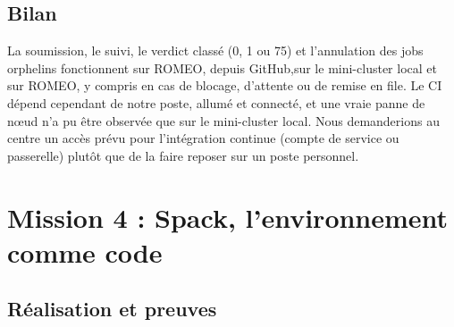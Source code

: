 \documentclass[11pt,a4paper]{article}
\begin{document}
\subsection{Bilan}

La soumission, le suivi, le verdict classé (0, 1 ou 75) et l'annulation des jobs orphelins
fonctionnent \ifghhpc sur ROMEO, depuis GitHub,\else sur le mini-cluster local\ifromeo{} et sur
ROMEO\fi,\fi{} y compris en cas de blocage, d'attente ou de remise en file. Le CI dépend cependant
de notre poste, allumé et connecté, et une vraie panne de nœud n'a pu être observée que sur le
mini-cluster local. Nous demanderions au centre un accès prévu pour l'intégration continue
(compte de service ou passerelle) plutôt que de la faire reposer sur un poste personnel.

\section{Mission 4 : Spack, l'environnement comme code}

\subsection{Réalisation et preuves}
\end{document}
